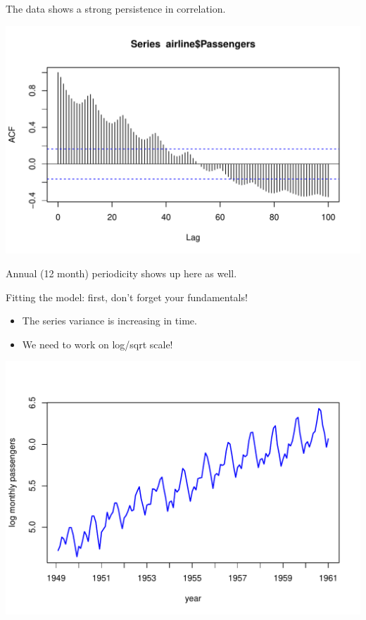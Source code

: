 \documentclass[12pt,xcolor=svgnames]{beamer}
\newcommand{\rd}{\color{red}}
\newcommand{\nochap}{\vspace{0.5cm}}
\begin{document}
\begin{frame}
\nochap

\vspace{-0.15cm}
The data shows a strong persistence in correlation.

\begin{center}
\includegraphics[scale=0.55,trim=10 20 0 20]{airlineacf_new}
\end{center}

\vspace{-0.15cm}
Annual (12 month) periodicity shows up here as well.

\end{frame}

\begin{frame}
\nochap

\vspace{-0.1cm}
Fitting the model: first, don't forget your fundamentals!
\begin{itemize}
\item The series variance is increasing in time.
\item {\rd We need to work on log/sqrt scale!}
\end{itemize}

\begin{center}
\includegraphics[scale=0.5,trim=10 20 0 50]{logairline_new}
\end{center}

\end{frame}
\end{document}
